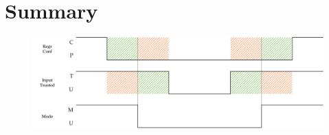 \section{Summary}


\begin{figure}
    \includegraphics[width=\textwidth]{figures/properties.png}
\end{figure}
